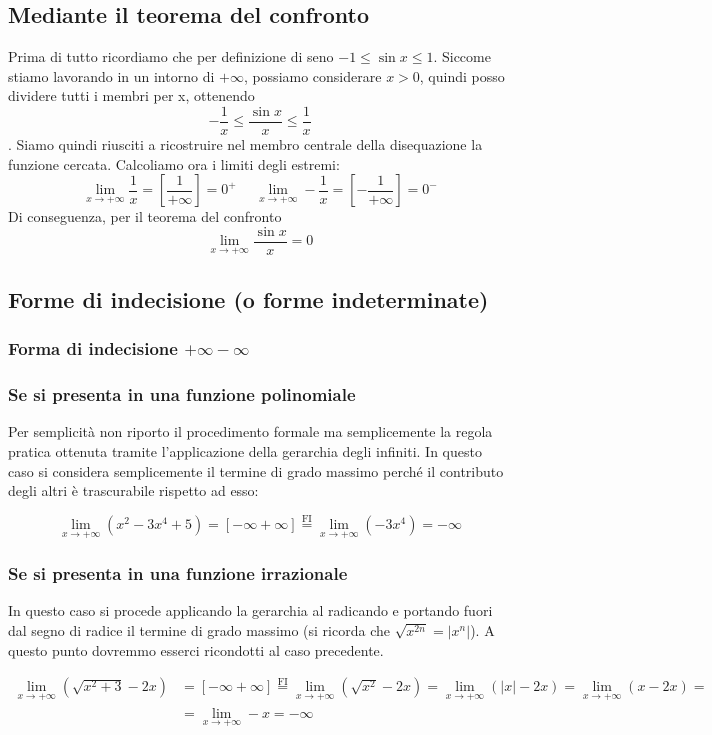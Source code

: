 \documentclass{book}     %
\begin{document}
\subsection{Mediante il teorema del confronto}
\begin{ex}
    Prima di tutto ricordiamo che per definizione di seno $-1\leq \sin x \leq 1$. Siccome stiamo lavorando in un intorno di $+\infty$, possiamo considerare $x>0$, quindi posso dividere tutti i membri per x, ottenendo \[-\frac{1}{x}\leq \frac{\sin x}{x}\leq \frac{1}{x}\]. Siamo quindi riusciti a ricostruire nel membro centrale della disequazione la funzione cercata. Calcoliamo ora i limiti degli estremi:
    \[\lim_{x\to +\infty}\frac{1}{x}=\left[\frac{1}{+\infty}\right]=0^+ ~~~~~~
    \lim_{x\to +\infty}-\frac{1}{x}=\left[-\frac{1}{+\infty}\right]=0^-\]
    Di conseguenza, per il teorema del confronto \[\lim_{x\to + \infty} \frac{\sin x}{x}=0\]
\end{ex}

\subsection{Forme di indecisione (o forme indeterminate)}
\subsubsection{Forma di indecisione $+\infty-\infty$}
\subsubsection{Se si presenta in una funzione polinomiale}
Per semplicità non riporto il procedimento formale ma semplicemente la regola pratica ottenuta tramite l'applicazione della gerarchia degli infiniti. In questo caso si considera semplicemente il termine di grado massimo perché il contributo degli altri è trascurabile rispetto ad esso:
\begin{ex}
\[\lim_{x\to +\infty}(x^2-3x^4+5)=[-\infty+\infty]\overset{\mathrm{FI}}{=}\lim_{x\to +\infty}(-3x^4)=-\infty\]
\end{ex}
\subsubsection{Se si presenta in una funzione irrazionale}
In questo caso si procede applicando la gerarchia al radicando e portando fuori dal segno di radice il termine di grado massimo (si ricorda che $\sqrt{x^{2n}}=|x^n|$). A questo punto dovremmo esserci ricondotti al caso precedente. 
\begin{ex}
\[\begin{aligned}\lim_{x\to +\infty}\left(\sqrt{x^2+3}-2x\right)&=[-\infty+\infty]\overset{\mathrm{FI}}{=}\lim_{x\to +\infty}\left(\sqrt{x^2}-2x\right)=\lim_{x\to +\infty}(|x|-2x) = \lim_{x\to +\infty}(x-2x) = \\&=\lim_{x\to +\infty}-x=-\infty\end{aligned}\]
\end{ex}
\end{document}
